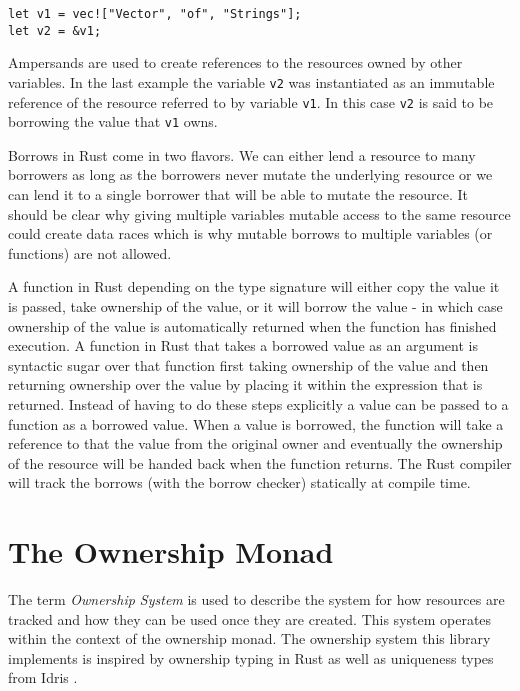 \documentclass[onehalf,11pt]{beavtex}
\begin{document}
\begin{verbatim}
let v1 = vec!["Vector", "of", "Strings"];
let v2 = &v1;
\end{verbatim}

Ampersands are used to create references to the resources owned by other
variables.
In the last example the variable \texttt{v2} was instantiated as an immutable
reference of the resource referred to by variable \texttt{v1}.
In this case \texttt{v2} is said to be borrowing the value
that \texttt{v1} owns.

Borrows in Rust come in two flavors. We can either lend a resource to many
borrowers as long as the borrowers never mutate the underlying resource or we
can lend it to a single borrower that will be able to mutate the
resource.\cite{rust_book_borrowing}
It should be clear why giving multiple variables mutable access to
the same resource could create data races which is why mutable borrows to
multiple variables (or functions) are not allowed.

A function in Rust depending on the type signature will either copy the value
it is passed, take ownership of the value, or it will borrow the value - in
which case ownership of the value is automatically returned when the function
has finished execution.\cite{rust_book_ownership}
A function in Rust that takes a borrowed value as an argument is
syntactic sugar over that function first taking ownership of the value and then
returning ownership over the value by placing it within the expression that is
returned.
Instead of having to do these steps explicitly a value can be passed to a
function as a borrowed value.  When a value is borrowed, the function will take
a reference to that the value from the original owner and eventually the
ownership of the resource will be handed back when the function returns.
The Rust compiler will track the borrows (with the borrow checker) statically at
compile time.

\chapter{The Ownership Monad}

The term \textit{Ownership System} is used to describe the system for how
resources are tracked and how they can be used once they are created. This
system operates within the context of the ownership monad.
The ownership system this library implements is inspired by
ownership typing in Rust \cite{rust_book_ownership}
as well as uniqueness types from Idris \cite{idris_uniqueness_types}.
\end{document}
